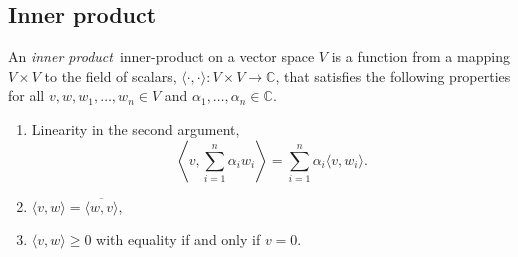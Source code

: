 \subsection{Inner product}



\begin{definition} \label{def:inner_product}
An \emph{inner product}~\gls{inner-product} on a vector space $V$ is a function from a mapping $V\times V$ to the field of scalars, $\langle \cdot, \cdot \rangle : V \times V \rightarrow \mathbb{C}$,  that satisfies the following properties for all $v, w, w_1, \ldots, w_n \in V$ and $\alpha_1, \ldots, \alpha_n \in \mathbb{C}.$

\begin{enumerate}
  \item Linearity in the second argument,$$ \left\langle v, \sum_{i=1}^n \alpha_i w_i\right\rangle = \sum_{i=1}^n \alpha_i \langle v, w_i\rangle. $$
  \item $\langle v,w \rangle = \overline{\langle w,v \rangle} $, 
  \item  $\langle v,w \rangle \geq 0 $ with equality if and only if $v = 0$.
\end{enumerate}
\end{definition}

